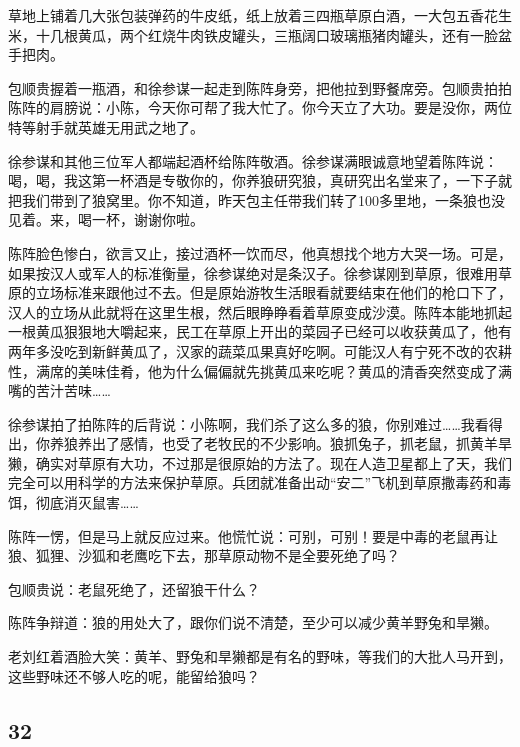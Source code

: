 \par 草地上铺着几大张包装弹药的牛皮纸，纸上放着三四瓶草原白酒，一大包五香花生米，十几根黄瓜，两个红烧牛肉铁皮罐头，三瓶阔口玻璃瓶猪肉罐头，还有一脸盆手把肉。
\par 包顺贵握着一瓶酒，和徐参谋一起走到陈阵身旁，把他拉到野餐席旁。包顺贵拍拍陈阵的肩膀说：小陈，今天你可帮了我大忙了。你今天立了大功。要是没你，两位特等射手就英雄无用武之地了。
\par 徐参谋和其他三位军人都端起酒杯给陈阵敬酒。徐参谋满眼诚意地望着陈阵说：喝，喝，我这第一杯酒是专敬你的，你养狼研究狼，真研究出名堂来了，一下子就把我们带到了狼窝里。你不知道，昨天包主任带我们转了100多里地，一条狼也没见着。来，喝一杯，谢谢你啦。
\par 陈阵脸色惨白，欲言又止，接过酒杯一饮而尽，他真想找个地方大哭一场。可是，如果按汉人或军人的标准衡量，徐参谋绝对是条汉子。徐参谋刚到草原，很难用草原的立场标准来跟他过不去。但是原始游牧生活眼看就要结束在他们的枪口下了，汉人的立场从此就将在这里生根，然后眼睁睁看着草原变成沙漠。陈阵本能地抓起一根黄瓜狠狠地大嚼起来，民工在草原上开出的菜园子已经可以收获黄瓜了，他有两年多没吃到新鲜黄瓜了，汉家的蔬菜瓜果真好吃啊。可能汉人有宁死不改的农耕性，满席的美味佳肴，他为什么偏偏就先挑黄瓜来吃呢？黄瓜的清香突然变成了满嘴的苦汁苦味……
\par 徐参谋拍了拍陈阵的后背说：小陈啊，我们杀了这么多的狼，你别难过……我看得出，你养狼养出了感情，也受了老牧民的不少影响。狼抓兔子，抓老鼠，抓黄羊旱獭，确实对草原有大功，不过那是很原始的方法了。现在人造卫星都上了天，我们完全可以用科学的方法来保护草原。兵团就准备出动“安二”飞机到草原撒毒药和毒饵，彻底消灭鼠害……
\par 陈阵一愣，但是马上就反应过来。他慌忙说：可别，可别！要是中毒的老鼠再让狼、狐狸、沙狐和老鹰吃下去，那草原动物不是全要死绝了吗？
\par 包顺贵说：老鼠死绝了，还留狼干什么？
\par 陈阵争辩道：狼的用处大了，跟你们说不清楚，至少可以减少黄羊野兔和旱獭。
\par 老刘红着酒脸大笑：黄羊、野兔和旱獭都是有名的野味，等我们的大批人马开到，这些野味还不够人吃的呢，能留给狼吗？






\subsection*{32}



